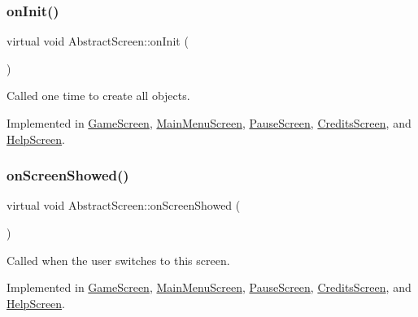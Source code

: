 \mbox{\label{class_abstract_screen_a7ab389bd33f4824d3d353b5a9e1616de}} 
\subsubsection{\texorpdfstring{on\+Init()}{onInit()}}
{\footnotesize\ttfamily virtual void Abstract\+Screen\+::on\+Init (\begin{DoxyParamCaption}{ }\end{DoxyParamCaption})\hspace{0.3cm}{\ttfamily [pure virtual]}}



Called one time to create all objects. 



Implemented in \mbox{\hyperlink{class_game_screen_a2748a44cf5e9ebe46f4e2e603bbfbae3}{Game\+Screen}}, \mbox{\hyperlink{class_main_menu_screen_a700bf80fbcb9d6f4110347f73b8c6e09}{Main\+Menu\+Screen}}, \mbox{\hyperlink{class_pause_screen_ae8196adf49b2e7439677a5360a8d43d4}{Pause\+Screen}}, \mbox{\hyperlink{class_credits_screen_a614ba7f8090fb0a69a31062a31bcbb86}{Credits\+Screen}}, and \mbox{\hyperlink{class_help_screen_a2649a31d286a6721dde6f87c2536d5c5}{Help\+Screen}}.

\mbox{\label{class_abstract_screen_a219687a34e6aed15a9eaf0d4414d1783}} 
\subsubsection{\texorpdfstring{on\+Screen\+Showed()}{onScreenShowed()}}
{\footnotesize\ttfamily virtual void Abstract\+Screen\+::on\+Screen\+Showed (\begin{DoxyParamCaption}{ }\end{DoxyParamCaption})\hspace{0.3cm}{\ttfamily [pure virtual]}}



Called when the user switches to this screen. 



Implemented in \mbox{\hyperlink{class_game_screen_a1dfaea8cc8d0edb3bd2711d20e97ebeb}{Game\+Screen}}, \mbox{\hyperlink{class_main_menu_screen_a484fb745ff8ad64b2533ff31f38c7a0c}{Main\+Menu\+Screen}}, \mbox{\hyperlink{class_pause_screen_a2eb2b032a3c3e833beb505c2df12396b}{Pause\+Screen}}, \mbox{\hyperlink{class_credits_screen_a3fd4bc101df8b7560ab590c07997d472}{Credits\+Screen}}, and \mbox{\hyperlink{class_help_screen_a65d1845f657954d98e60cd042020c518}{Help\+Screen}}.

